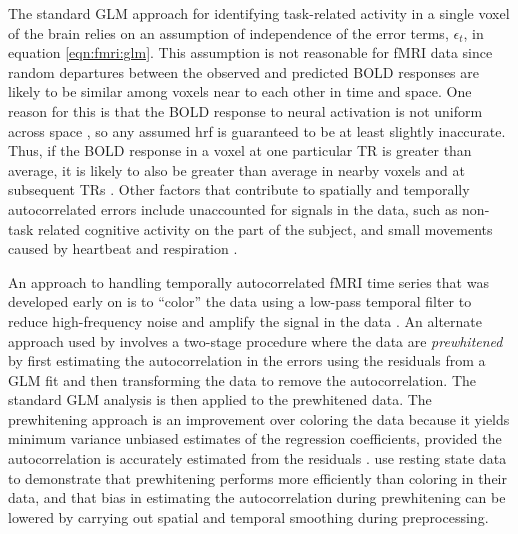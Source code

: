 The standard GLM approach for identifying task-related activity in a single voxel of the brain relies on an assumption of independence of the error terms, $\epsilon_t$, in equation \eqref{eqn:fmri:glm}. This assumption is not reasonable for fMRI data since random departures between the observed and predicted BOLD responses are likely to be similar among voxels near to each other in time and space. One reason for this is that the BOLD response to neural activation is not uniform across space \citep{aguirre:zarahn:varyBOLD:1998}, so any assumed hrf is guaranteed to be at least slightly inaccurate. Thus, if the BOLD response in a voxel at one particular TR is greater than average, it is likely to also be greater than average in nearby voxels and at subsequent TRs \cite[Chapter 1][]{ashby:fmri:2011}. Other factors that contribute to spatially and temporally autocorrelated errors include unaccounted for signals in the data, such as non-task related cognitive activity on the part of the subject, and small movements caused by heartbeat and respiration \citep{loc:jos:arma:1997}.

An approach to handling temporally autocorrelated fMRI time series that was developed early on is to ``color'' the data using a low-pass temporal filter to reduce high-frequency noise and amplify the signal in the data \citep{friston:holmes:color:1995,wors:frist:color:1995}. An alternate approach used by \citet{bullmore:prewhiten:1996} involves a two-stage procedure where the data are \emph{prewhitened} by first estimating the autocorrelation in the errors using the residuals from a GLM fit and then transforming the data to remove the autocorrelation. The standard GLM analysis is then applied to the prewhitened data. The prewhitening approach is an improvement over coloring the data because it yields minimum variance unbiased estimates of the regression coefficients, provided the autocorrelation is accurately estimated from the residuals \citep{frist:penny:classical:2002}. \citet{wool:rip:auto:2001} use resting state data to demonstrate that prewhitening performs more efficiently than coloring in their data, and that bias in estimating the autocorrelation during prewhitening can be lowered by carrying out spatial and temporal smoothing during preprocessing.

